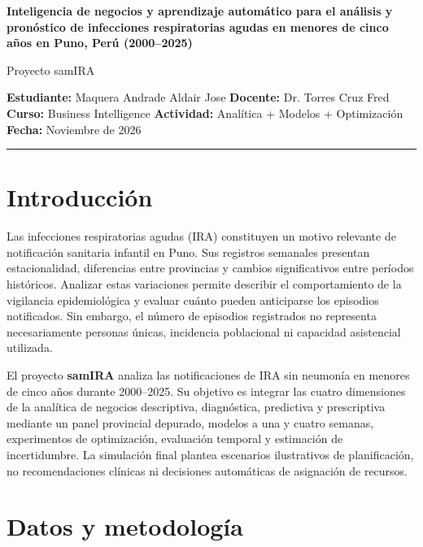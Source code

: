 \documentclass[10pt,a4paper]{article}
\begin{document}
\begin{center}
{\Large\bfseries Inteligencia de negocios y aprendizaje automático para el análisis y pronóstico de infecciones respiratorias agudas en menores de cinco años en Puno, Perú (2000--2025)\par}
\vspace{0.2cm}
{\normalsize Proyecto samIRA}\par
\vspace{0.15cm}
\small
\textbf{Estudiante:} Maquera Andrade Aldair Jose \quad
\textbf{Docente:} Dr. Torres Cruz Fred\\
\textbf{Curso:} Business Intelligence \quad
\textbf{Actividad:} Analítica + Modelos + Optimización\\
\textbf{Fecha:} Noviembre de 2026
\end{center}
\vspace{0.1cm}\hrule

\section{Introducción}

Las infecciones respiratorias agudas (IRA) constituyen un motivo relevante de notificación sanitaria infantil en Puno. Sus registros semanales presentan estacionalidad, diferencias entre provincias y cambios significativos entre períodos históricos. Analizar estas variaciones permite describir el comportamiento de la vigilancia epidemiológica y evaluar cuánto pueden anticiparse los episodios notificados. Sin embargo, el número de episodios registrados no representa necesariamente personas únicas, incidencia poblacional ni capacidad asistencial utilizada.

El proyecto \textbf{samIRA} analiza las notificaciones de IRA sin neumonía en menores de cinco años durante 2000--2025. Su objetivo es integrar las cuatro dimensiones de la analítica de negocios descriptiva, diagnóstica, predictiva y prescriptiva mediante un panel provincial depurado, modelos a una y cuatro semanas, experimentos de optimización, evaluación temporal y estimación de incertidumbre. La simulación final plantea escenarios ilustrativos de planificación, no recomendaciones clínicas ni decisiones automáticas de asignación de recursos.

\section{Datos y metodología}
\end{document}
